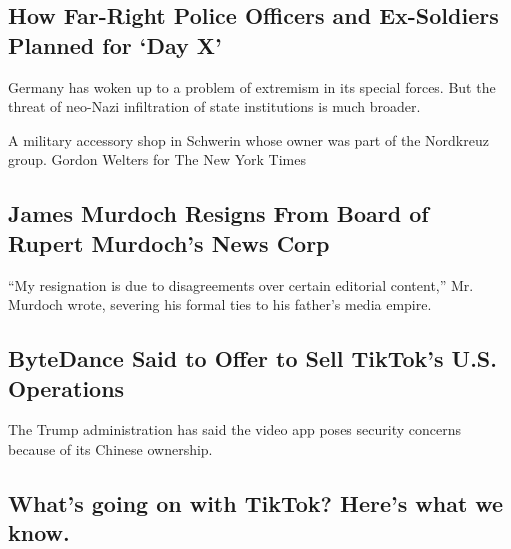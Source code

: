 \hypertarget{how-far-right-police-officers-and-ex-soldiers-planned-for-day-x}{%
\subsection{How Far-Right Police Officers and Ex-Soldiers Planned for
`Day
X'}\label{how-far-right-police-officers-and-ex-soldiers-planned-for-day-x}}

Germany has woken up to a problem of extremism in its special forces.
But the threat of neo-Nazi infiltration of state institutions is much
broader.

\href{/2020/08/01/world/europe/germany-nazi-infiltration.html}{}

A military accessory shop in Schwerin whose owner was part of the
Nordkreuz group. Gordon Welters for The New York Times

\href{/2020/07/31/business/media/james-murdoch-resigns-news-corp.html}{}

\hypertarget{james-murdoch-resigns-from-board-of-rupert-murdochs-news-corp}{%
\subsection{James Murdoch Resigns From Board of Rupert Murdoch's News
Corp}\label{james-murdoch-resigns-from-board-of-rupert-murdochs-news-corp}}

``My resignation is due to disagreements over certain editorial
content,'' Mr. Murdoch wrote, severing his formal ties to his father's
media empire.

\href{/2020/08/01/technology/tiktok-sale-trump-ban.html}{}

\hypertarget{bytedance-said-to-offer-to-sell-tiktoks-us-operations}{%
\subsection{ByteDance Said to Offer to Sell TikTok's U.S.
Operations}\label{bytedance-said-to-offer-to-sell-tiktoks-us-operations}}

The Trump administration has said the video app poses security concerns
because of its Chinese ownership.

\href{/2020/08/01/technology/tiktok-trump-microsoft-bytedance-china-ban.html}{}

\hypertarget{whats-going-on-with-tiktok-heres-what-we-know}{%
\subsection{What's going on with TikTok? Here's what we
know.}\label{whats-going-on-with-tiktok-heres-what-we-know}}

